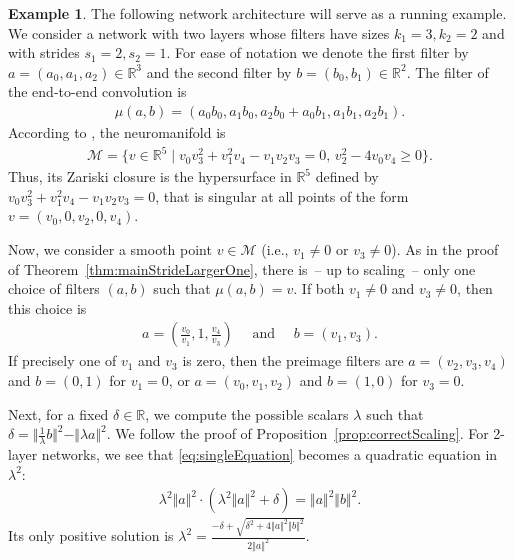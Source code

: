 \documentclass[twoside]{article}
\theoremstyle{definition}
\newtheorem{example}[theorem]{Example}
\theoremstyle{remark}
\begin{document}
\begin{example}
    \label{ex:running}
    The following network architecture will serve as a running example. We consider a network with two layers whose filters have sizes $k_1 = 3, k_2=2$ and with strides $s_1 = 2, s_2 = 1$.  For ease of notation we denote the first filter by $a=(a_0,a_1,a_2) \in \mathbb{R}^3$ and the second filter by $b=(b_0,b_1) \in \mathbb{R}^2$. 
The filter of the end-to-end convolution is
\begin{align*}%
    \mu(a,b) =  (a_0b_0,a_1b_0,a_2b_0 + a_0b_1, a_1b_1,a_2b_1).
\end{align*}
According to \cite[Example~4.12]{kohn2022geometry}, the neuromanifold is
\begin{align*}
    \mathcal{M} = \{ v \in \mathbb{R}^5 \mid v_0 v_3^2 + v_1^2v_4 - v_1v_2v_3 =0, \, v_2^2 - 4v_0v_4 \geq 0 \}.
\end{align*}
Thus, its Zariski closure is the hypersurface in $\mathbb{R}^5$ defined by $v_0 v_3^2 + v_1^2v_4 - v_1v_2v_3 =0$, that is singular at all points of the form $v = (v_0,0,v_2,0,v_4)$.

Now, we consider a smooth point $ v \in \mathcal{M}$ (i.e., $v_1 \neq 0$ or $v_3 \neq 0$).
As in the proof of Theorem~\ref{thm:mainStrideLargerOne}, there is~-- up to scaling~-- only one choice of filters $(a,b)$ such that $\mu(a,b) = v$. 
If both $v_1 \neq 0$ and $v_3 \neq 0$, then this choice is
\begin{align}\label{eq:substByV}
    a = (\frac{v_0}{v_1}, 1, \frac{v_4}{v_3}) \quad \text{ and } \quad
    b = (v_1,v_3).
\end{align}
If precisely one of $v_1$ and $v_3$ is zero, then the preimage filters are $a=(v_2,v_3,v_4)$ and $ b=(0,1)$ for $v_1=0$, or $a=(v_0,v_1,v_2)$ and $ b=(1,0)$ for $v_3=0$.

Next, for a fixed $\delta \in \mathbb{R}$, we compute the possible scalars $\lambda$ such that $\delta = \Vert \frac{1}{\lambda} b  \Vert^2 - \Vert \lambda a \Vert^2$.
We follow the proof of Proposition~\ref{prop:correctScaling}.
For 2-layer networks, we see that \eqref{eq:singleEquation} becomes a quadratic equation in $\lambda^2$:
\begin{align*}
    \lambda^2 \Vert a \Vert^2 \cdot (\lambda^2 \Vert a \Vert^2 + \delta) = \Vert a \Vert^2 \Vert b \Vert^2.
\end{align*}
Its only positive solution is 
$\lambda^2 = \frac{-\delta + \sqrt{\delta^2+4\Vert a \Vert^2 \Vert b \Vert^2}}{2\Vert a \Vert^2 }$.


\end{example}
\end{document}
